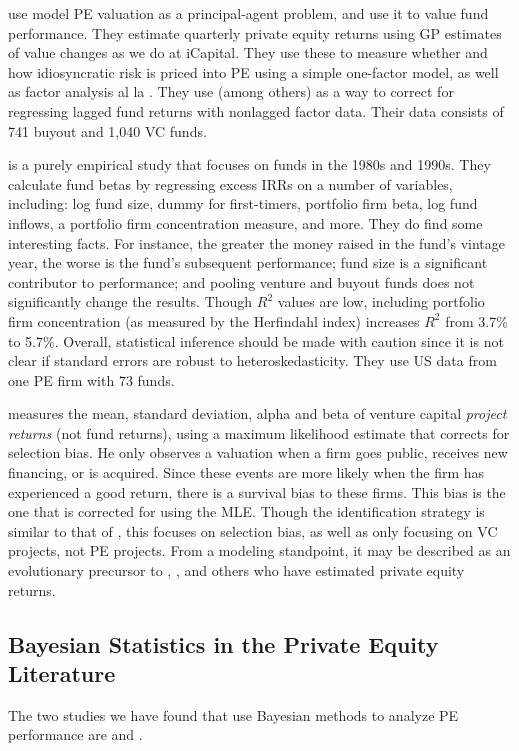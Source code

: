 \documentclass[11pt]{article}
\begin{document}
\cite{Ewens2013} use model PE valuation as a principal-agent problem, and use it to value fund performance. They estimate quarterly private equity returns using GP estimates of value changes as we do at iCapital. They use these to measure whether and how idiosyncratic risk is priced into PE using a simple one-factor model, as well as factor analysis al la \cite{Fama1993}. They use \cite{Dimson1979} (among others) as a way to correct for regressing lagged fund returns with nonlagged factor data. Their data consists of 741 buyout and 1,040 VC funds. 

\cite{Ljungqvist2002} is a purely empirical study that focuses on funds in the 1980s and 1990s. They calculate fund betas by regressing excess IRRs on a number of variables, including: log fund size, dummy for first-timers, portfolio firm beta, log fund inflows, a portfolio firm concentration measure, and more. They do find some interesting facts. For instance, the greater the money raised in the fund's vintage year, the worse is the fund's subsequent performance; fund size is a significant contributor to performance; and pooling venture and buyout funds does not significantly change the results. Though $R^2$ values are low, including portfolio firm concentration (as measured by the Herfindahl index) increases $R^2$ from 3.7\% to 5.7\%. Overall, statistical inference should be made with caution since it is not clear if standard errors are robust to heteroskedasticity. They use US data from one PE firm with 73 funds.

\cite{Cochrane2004} measures the mean, standard deviation, alpha and beta of venture capital \emph{project returns} (not fund returns), using a maximum likelihood estimate that corrects for selection bias. He only observes a valuation when a firm goes public, receives new financing, or is acquired. Since these events are more likely when the firm has experienced a good return, there is a survival bias to these firms. This bias is the one that is corrected for using the MLE. Though the identification strategy is similar to that of \cite{Ang2014}, this focuses on selection bias, as well as only focusing on VC projects, not PE projects. From a modeling standpoint, it may be described as an evolutionary precursor to \cite{Ang2014}, \cite{Korteweg2011}, and others who have estimated private equity returns. 

\subsection{Bayesian Statistics in the Private Equity Literature}
The two studies we have found that use Bayesian methods to analyze PE performance are \cite{Ang2014} and \cite{Sorensen2013}. 
\end{document}
